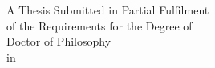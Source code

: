 
\pagestyle{empty}

\begin{titlepage}
	\tgherosfont
	\centering
	\vfill
	\vspace*{1.0cm}
    {
        \addtolength{\leftskip}{-10pt}
        \addtolength{\rightskip}{-10pt}
        \LARGE \textbf{\thesisTitle} \\[30mm]
    }
	{\LARGE \thesisName } \\[30mm]
	{\Large A Thesis Submitted in Partial Fulfilment} \\[5mm]
	{\Large of the Requirements for the Degree of} \\ [5mm]
	{\Large Doctor of Philosophy} \\ [5mm]
	{\Large in } \\ [5mm]
	{\Large \thesisUniversityDepartment} \\  [40mm]
	{\Large \thesisUniversity} \\ [5mm]
 	{\Large \thesisDate}

\end{titlepage}

\cleardoublepage
